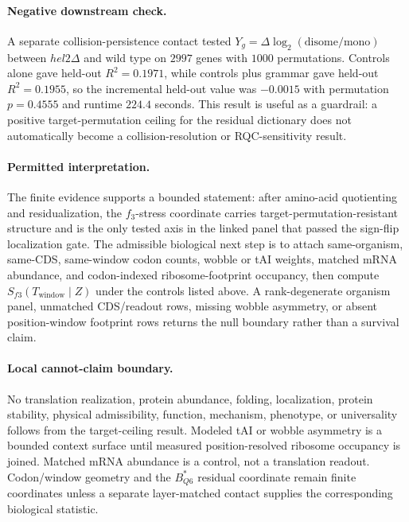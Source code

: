 \paragraph{Negative downstream check.}
A separate collision-persistence contact tested $Y_g = \Delta\log_2(\mathrm{disome}/\mathrm{mono})$ between $hel2\Delta$ and wild type on $2997$ genes with $1000$ permutations.  Controls alone gave held-out $R^2=0.1971$, while controls plus grammar gave held-out $R^2=0.1955$, so the incremental held-out value was $-0.0015$ with permutation $p=0.4555$ and runtime $224.4$ seconds.  This result is useful as a guardrail: a positive target-permutation ceiling for the residual dictionary does not automatically become a collision-resolution or RQC-sensitivity result.

\paragraph{Permitted interpretation.}
The finite evidence supports a bounded statement: after amino-acid quotienting and residualization, the $f_3$-stress coordinate carries target-permutation-resistant structure and is the only tested axis in the linked panel that passed the sign-flip localization gate.  The admissible biological next step is to attach same-organism, same-CDS, same-window codon counts, wobble or tAI weights, matched mRNA abundance, and codon-indexed ribosome-footprint occupancy, then compute $S_{f3}(T_{\mathrm{window}} \mid Z)$ under the controls listed above.  A rank-degenerate organism panel, unmatched CDS/readout rows, missing wobble asymmetry, or absent position-window footprint rows returns the null boundary rather than a survival claim.

\paragraph{Local cannot-claim boundary.}
No translation realization, protein abundance, folding, localization, protein stability, physical admissibility, function, mechanism, phenotype, or universality follows from the target-ceiling result.  Modeled tAI or wobble asymmetry is a bounded context surface until measured position-resolved ribosome occupancy is joined.  Matched mRNA abundance is a control, not a translation readout.  Codon/window geometry and the $B^{\ast}_{Q6}$ residual coordinate remain finite coordinates unless a separate layer-matched contact supplies the corresponding biological statistic.